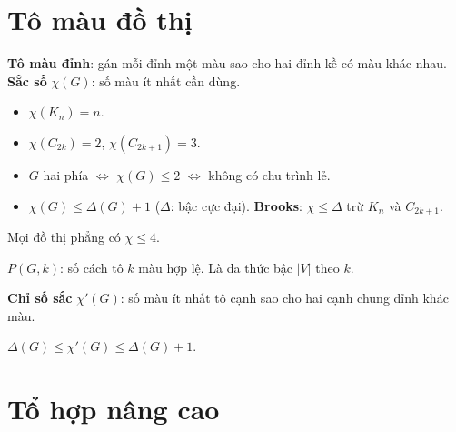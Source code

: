 \documentclass[12pt,a4paper]{article}
\begin{document}
\section{Tô màu đồ thị}

\begin{dinhnghia}
  \textbf{Tô màu đỉnh}: gán mỗi đỉnh một màu sao cho hai đỉnh kề có màu khác nhau. \textbf{Sắc số} $\chi(G)$: số màu ít nhất cần dùng.
\end{dinhnghia}

\begin{tinhchat}
  \begin{itemize}
    \item $\chi(K_n) = n$.
    \item $\chi(C_{2k}) = 2$, $\chi(C_{2k+1}) = 3$.
    \item $G$ hai phía $\Leftrightarrow$ $\chi(G) \le 2$ $\Leftrightarrow$ không có chu trình lẻ.
    \item $\chi(G) \le \Delta(G) + 1$ ($\Delta$: bậc cực đại). \textbf{Brooks}: $\chi \le \Delta$ trừ $K_n$ và $C_{2k+1}$.
  \end{itemize}
\end{tinhchat}

\begin{dinhly}[title={Định lý bốn màu}]
  Mọi đồ thị phẳng có $\chi \le 4$.
\end{dinhly}

\begin{dinhnghia}[title={Đa thức sắc}]
  $P(G, k)$: số cách tô $k$ màu hợp lệ. Là đa thức bậc $|V|$ theo $k$.
\end{dinhnghia}

\begin{dinhnghia}[title={Tô màu cạnh}]
  \textbf{Chỉ số sắc} $\chi'(G)$: số màu ít nhất tô cạnh sao cho hai cạnh chung đỉnh khác màu.
\end{dinhnghia}

\begin{dinhly}[title={Vizing}]
  $\Delta(G) \le \chi'(G) \le \Delta(G) + 1$.
\end{dinhly}

\section{Tổ hợp nâng cao}
\end{document}
